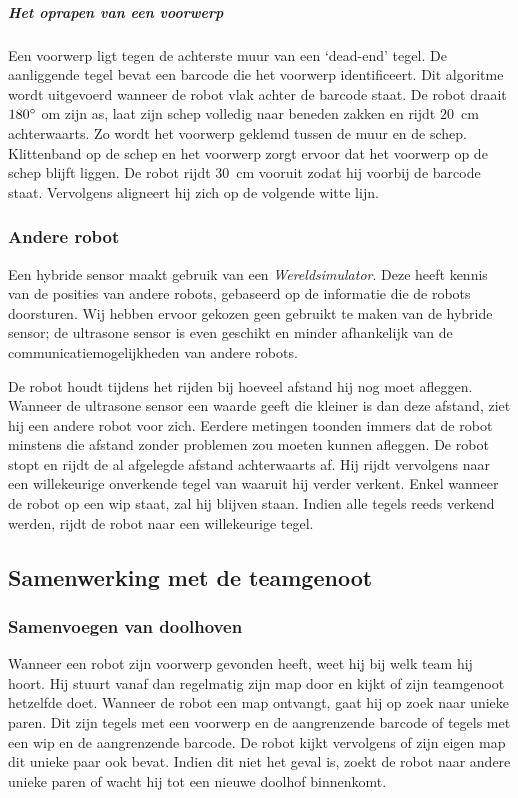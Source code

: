 \documentclass[eind]{penoverslag}
\begin{document}
\subparagraph{Het oprapen van een voorwerp}
Een voorwerp ligt tegen de achterste muur van een `dead-end' tegel. De aanliggende tegel bevat een barcode die het voorwerp identificeert. Dit algoritme wordt uitgevoerd wanneer de robot vlak achter de barcode staat. De robot draait $180\degree$ om zijn as, laat zijn schep volledig naar beneden zakken en rijdt $20$~cm achterwaarts. Zo wordt het voorwerp geklemd tussen de muur en de schep. Klittenband op de schep en het voorwerp zorgt ervoor dat het voorwerp op de schep blijft liggen. De robot rijdt $30$~cm vooruit zodat hij voorbij de barcode staat. Vervolgens aligneert hij zich op de volgende witte lijn.

\subsubsection{Andere robot}
\label{sssec:AlgoCollision}
Een hybride sensor maakt gebruik van een \textit{Wereldsimulator}.
Deze heeft kennis van de posities van andere robots,
gebaseerd op de informatie die de robots doorsturen.
Wij hebben ervoor gekozen geen gebruikt te maken van de hybride sensor; de ultrasone sensor is even geschikt en minder afhankelijk van de communicatiemogelijkheden van andere robots.

De robot houdt tijdens het rijden bij hoeveel afstand hij nog moet afleggen. Wanneer de ultrasone sensor een waarde geeft die kleiner is dan deze afstand, ziet hij een andere robot voor zich. Eerdere metingen toonden immers dat de robot minstens die afstand zonder problemen zou moeten kunnen afleggen. De robot stopt en rijdt de al afgelegde afstand achterwaarts af. Hij rijdt vervolgens naar een willekeurige onverkende tegel van waaruit hij verder verkent. Enkel wanneer de robot op een wip staat, zal hij blijven staan. Indien alle tegels reeds verkend werden, rijdt de robot naar een willekeurige tegel.

\subsection{Samenwerking met de teamgenoot}
\label{ssec:AlgoSamen}

\subsubsection{Samenvoegen van doolhoven}
\label{sssec:AlgoMappen}
Wanneer een robot zijn voorwerp gevonden heeft, weet hij bij welk team hij hoort. Hij stuurt vanaf dan regelmatig zijn map door en kijkt of zijn teamgenoot hetzelfde doet.
Wanneer de robot een map ontvangt, gaat hij op zoek naar unieke paren. Dit zijn tegels met een voorwerp en de aangrenzende barcode of tegels met een wip en de aangrenzende barcode. De robot kijkt vervolgens of zijn eigen map dit unieke paar ook bevat. Indien dit niet het geval is, zoekt de robot naar andere unieke paren of wacht hij tot een nieuwe doolhof binnenkomt.
\end{document}
